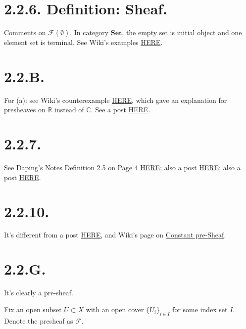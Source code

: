 \section{2.2.6. Definition: Sheaf.}

Comments on $\mathscr{F} (\emptyset)$. In category $\textbf{Set}$, the empty set is initial object and one element set is terminal. See Wiki's examples \href{https://en.wikipedia.org/wiki/Initial_and_terminal_objects#:~:text=Similarly%2C%20the%20empty%20space%20is,hence%20the%20unique%20zero%20object.}{HERE}.

\section{2.2.B.}

For (a): see Wiki's counterexample \href{https://en.wikipedia.org/wiki/Sheaf_(mathematics)}{HERE}, which gave an explanation for presheaves on $\mathbb R$ instead of $\mathbb C$.
See a post \href{https://math.stackexchange.com/questions/2946197/why-is-the-bounded-functions-not-a-sheaf}{HERE}.

\section{2.2.7.}

See Daping's Notes Definition 2.5 on Page 4 \href{http://www.math.uchicago.edu/%7Emay/VIGRE/VIGRE2011/REUPapers/WengD.pdf}{HERE}; also a post \href{https://math.stackexchange.com/questions/4080618/describe-sheaf-properties-via-equalizers}{HERE}; also a post \href{https://math.stackexchange.com/questions/453203/definition-of-sheaf-using-equalizer}{HERE}.

\section{2.2.10.}
It's different from a post \href{https://math.stackexchange.com/questions/195363/constant-presheaf-not-necessarily-a-sheaf-proof}{HERE}, and Wiki's page on \href{https://en.wikipedia.org/wiki/Constant_sheaf}{Constant pre-Sheaf}. 

\section{2.2.G.}
It's clearly a pre-sheaf.

Fix an open subset $U\subset X$ with an open cover $\{U_i\}_{i\in I}$ for some index set $I$. Denote the presheaf as $\mathscr F$.

